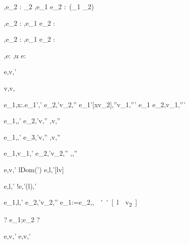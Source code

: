   {
   {\Gamma,\Sigma \infers e_2 : \Task \tau_2}}
  {\Gamma,\Sigma \infers e_1 \And e_2 : \Task\,(\tau_1 \times \tau_2)}


  {
   {\Gamma,\Sigma \infers e_2 : \Task \tau}}
  {\Gamma,\Sigma \infers e_1 \Or e_2 : \Task \tau}


  {
   {\Gamma,\Sigma \infers e_2 : \Task \tau}}
  {\Gamma,\Sigma \infers e_1 \Xor e_2 : \Task \tau}


  {\Gamma,\Sigma\infers e:\Task\tau}
  {\Gamma,\Sigma\infers u \At e:\Task\tau}





  {e,\sigma \evaluate v,\sigma'}


  {}
  {v,\sigma \evaluate v,\sigma}


  {e_1,\sigma \evaluate \lambda x:\tau.e_1',\sigma' \Quad
   e_2,\sigma'\evaluate v_2,\sigma'' \Quad
   e_1'[x\mapsto v_2],\sigma''\evaluate v_1,\sigma'''}
  {e_1 e_2,\sigma \evaluate v_1,\sigma'''}


  {e_1,\sigma \evaluate \True,\sigma' \Quad
   e_2,\sigma'\evaluate v,\sigma''}
  {,\sigma \evaluate v,\sigma''}

  {e_1,\sigma \evaluate \False,\sigma' \Quad
   e_3,\sigma'\evaluate v,\sigma''}
  {,\sigma \evaluate v,\sigma''}


  {e_1,\sigma \evaluate v_1,\sigma' \Quad
   e_2,\sigma'\evaluate v_2,\sigma''}
  {,\sigma \evaluate{},\sigma''}


  {e,\sigma \evaluate v,\sigma' \Quad
   l\not\in Dom(\sigma')}
  {\Ref e,\sigma \evaluate l,\sigma'[l\mapsto v]}

  {e,\sigma \evaluate l,\sigma'}
  {!e,\sigma \evaluate \sigma'(l),\sigma'}

  {e_1,\sigma \evaluate l,\sigma' \Quad
   e_2,\sigma'\evaluate v_2,\sigma''}
  {e_1:=e_2,\sigma \evaluate \unit,\sigma''[l\mapsto v_2]}


  {?}
  {e_1;e_2 \evaluate ?}

  {e,\sigma \evaluate v,\sigma'}
  {\Edit e,\sigma \evaluate \Edit v,\sigma'}


